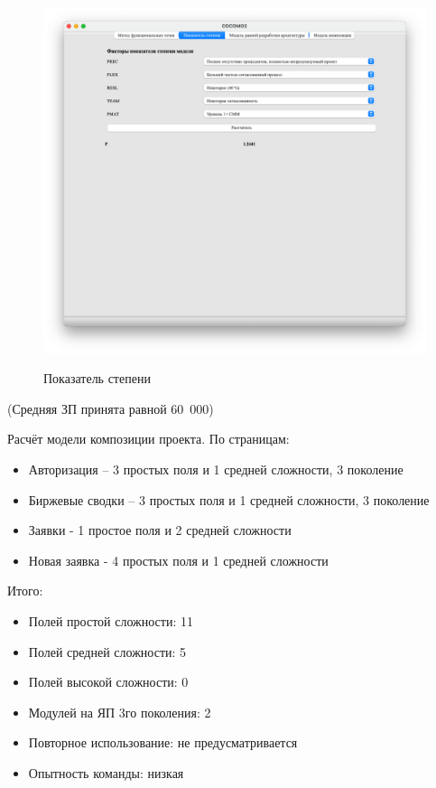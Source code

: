 \begin{figure}[ht!]
	\includegraphics[width=1\linewidth]{assets/images/2.2.png}
	\label{fig:r2}
	\caption{Показатель степени}
\end{figure}
\FloatBarrier

(Средняя ЗП принята равной 60 000)

Расчёт модели композиции проекта. По страницам:

\begin{itemize}
	\item Авторизация – 3 простых поля и 1 средней сложности, 3 поколение
	\item Биржевые сводки – 3 простых поля и 1 средней сложности, 3 поколение
	\item Заявки - 1 простое поля и 2 средней сложности
	\item Новая заявка - 4 простых поля и 1 средней сложности
\end{itemize}

Итого:
\begin{itemize}
	\item Полей простой сложности: 11
	\item Полей средней сложности: 5
	\item Полей высокой сложности: 0
	\item Модулей на ЯП 3го поколения: 2
	\item Повторное использование: не предусматривается
	\item Опытность команды: низкая
\end{itemize}

